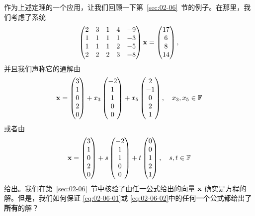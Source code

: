 作为上述定理的一个应用，让我们回顾一下第~\ref{sec:02-06}~节的例子。在那里，我们考虑了系统
$$
\begin{pmatrix} 2 & 3 & 1 & 4 & -9 \\ 1 & 1 & 1 & 1 & -3 \\ 1 & 1 & 1 & 2 & -5 \\ 2 & 2 & 2 & 3 & -8 \end{pmatrix} \mathbf{x} = \begin{pmatrix} 17 \\ 6 \\ 8 \\ 14 \end{pmatrix},
$$
并且我们声称它的通解由
$$
\mathbf{x} = \begin{pmatrix} 3 \\ 1 \\ 0 \\ 2 \\ 0 \end{pmatrix} + x_3 \begin{pmatrix} -2 \\ 1 \\ 1 \\ 0 \\ 0 \end{pmatrix} + x_5 \begin{pmatrix} 2 \\ -1 \\ 0 \\ 2 \\ 1 \end{pmatrix}, \quad x_3, x_5 \in \mathbb{F}
$$
或者由
$$
\mathbf{x} = \begin{pmatrix} 3 \\ 1 \\ 0 \\ 2 \\ 0 \end{pmatrix} + s \begin{pmatrix} -2 \\ 1 \\ 1 \\ 0 \\ 0 \end{pmatrix} + t \begin{pmatrix} 0 \\ 0 \\ 1 \\ 2 \\ 1 \end{pmatrix}, \quad s, t \in \mathbb{F}
$$
给出。我们在第~\ref{sec:02-06}~节中核验了由任一公式给出的向量 $\mathbf{x}$ 确实是方程的解。但是，我们如何保证 \eqref{eq:02-06-01}或 \eqref{eq:02-06-02}中的任何一个公式都给出了\textbf{所有}的解？

